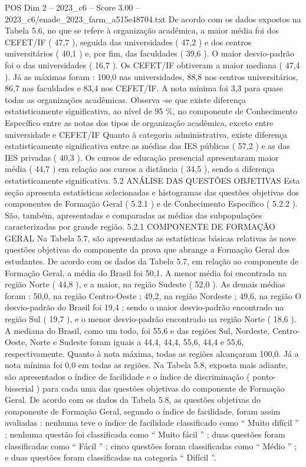 \begin{textsample}{POS Dim 2 – 2023\_c6 – Score 3.00 – 2023\_c6/enade\_2023\_farm\_a515e48704.txt}
De acordo com os dados expostos na Tabela 5.6, no que se refere à organização acadêmica, a maior média foi dos CEFET/IF ( 47,7 ), seguida das universidades ( 47,2 ) e dos centros universitários ( 40,1 ) e, por fim, das faculdades ( 39,6 ).
O maior desvio-padrão foi o das universidades ( 16,7 ).
Os CEFET/IF obtiveram a maior mediana ( 47,4 ).
Já as máximas foram : 100,0 nas universidades, 88,8 nos centros universitários, 86,7 nas faculdades e 83,4 nos CEFET/IF.
A nota mínima foi 3,3 para quase todas as organizações acadêmicas.
Observa -se que existe diferença estatisticamente significativa, ao nível de 95 \%, no componente de Conhecimento Específico entre as notas dos tipos de organização acadêmica, exceto entre universidade e CEFET/IF Quanto à categoria administrativa, existe diferença estatisticamente significativa entre as médias das IES públicas ( 57,2 ) e as das IES privadas ( 40,3 ).
Os cursos de educação presencial apresentaram maior média ( 44,7 ) em relação aos cursos a distância ( 34,5 ), sendo a diferença estatisticamente significativa. 5.2 ANÁLISE DAS QUESTÕES OBJETIVAS Esta seção apresenta estatísticas selecionadas e histogramas das questões objetivas dos componentes de Formação Geral ( 5.2.1 ) e de Conhecimento Específico ( 5.2.2 ).
São, também, apresentadas e comparadas as médias das subpopulações caracterizadas por grande região. 5.2.1 COMPONENTE DE FORMAÇÃO GERAL Na Tabela 5.7, são apresentadas as estatísticas básicas relativas às nove questões objetivas do componente da prova que abrange a Formação Geral dos estudantes.
De acordo com os dados da Tabela 5.7, em relação ao componente de Formação Geral, a média do Brasil foi 50,1.
A menor média foi encontrada na região Norte ( 44,8 ), e a maior, na região Sudeste ( 52,0 ).
As demais médias foram : 50,0, na região Centro-Oeste ; 49,2, na região Nordeste ; 49,6, na região O desvio-padrão do Brasil foi 19,4 ; sendo o maior desvio-padrão encontrado na região Sul ( 19,7 ), e o menor desvio-padrão encontrado na região Norte ( 18,6 ).
A mediana do Brasil, como um todo, foi 55,6 e das regiões Sul, Nordeste, Centro-Oeste, Norte e Sudeste foram iguais a 44,4, 44,4, 55,6, 44,4 e 55,6, respectivamente.
Quanto à nota máxima, todas as regiões alcançaram 100,0.
Já a nota mínima foi 0,0 em todas as regiões.
Na Tabela 5.8, exposta mais adiante, são apresentados o índice de facilidade e o índice de discriminação ( ponto-bisserial ) para cada uma das questões objetivas do componente de Formação Geral.
De acordo com os dados da Tabela 5.8, as questões objetivas do componente de Formação Geral, segundo o índice de facilidade, foram assim avaliadas : nenhuma teve o índice de facilidade classificado como “ Muito difícil ” ; nenhuma questão foi classificada como “ Muito fácil ” ; duas questões foram classificadas como “ Fácil ” ; cinco questões foram classificadas como “ Médio ” ; e duas questões foram classificadas na categoria “ Difícil ”.

\end{textsample}
